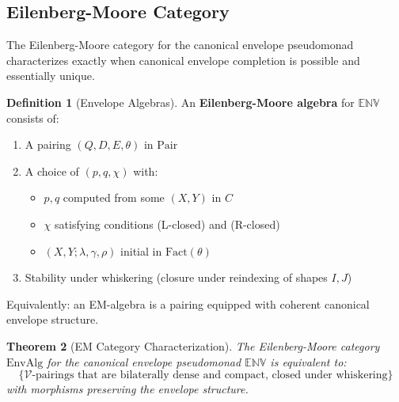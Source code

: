 \documentclass[11pt]{article}
\theoremstyle{plain}
\newtheorem{theorem}{Theorem}[section]
\theoremstyle{definition}
\newtheorem{definition}[theorem]{Definition}
\theoremstyle{remark}
\newcommand{\V}{\mathcal{V}}
\newcommand{\Fact}{\mathrm{Fact}}
\newcommand{\Pair}{\mathrm{Pair}}
\newcommand{\EnvAlg}{\mathrm{EnvAlg}}
\begin{document}
\subsection{Eilenberg-Moore Category}

The Eilenberg-Moore category for the canonical envelope pseudomonad characterizes exactly when canonical envelope completion is possible and essentially unique.

\begin{definition}[Envelope Algebras]
An \textbf{Eilenberg-Moore algebra} for $\mathbb{ENV}$ consists of:

\begin{enumerate}
\item A pairing $(Q, D, E, \theta)$ in $\Pair$
\item A choice of $(p, q, \chi)$ with:
\begin{itemize}
\item $p, q$ computed from some $(X, Y)$ in $C$
\item $\chi$ satisfying conditions (L-closed) and (R-closed)  
\item $(X, Y; \lambda, \gamma, \rho)$ initial in $\Fact(\theta)$
\end{itemize}
\item Stability under whiskering (closure under reindexing of shapes $I, J$)
\end{enumerate}

Equivalently: an EM-algebra is a pairing equipped with coherent canonical envelope structure.
\end{definition}

\begin{theorem}[EM Category Characterization]
The Eilenberg-Moore category $\EnvAlg$ for the canonical envelope pseudomonad $\mathbb{ENV}$ is equivalent to:
$$
\{\text{$\V$-pairings that are bilaterally dense and compact, closed under whiskering}\}
$$
with morphisms preserving the envelope structure.
\end{theorem}
\end{document}
